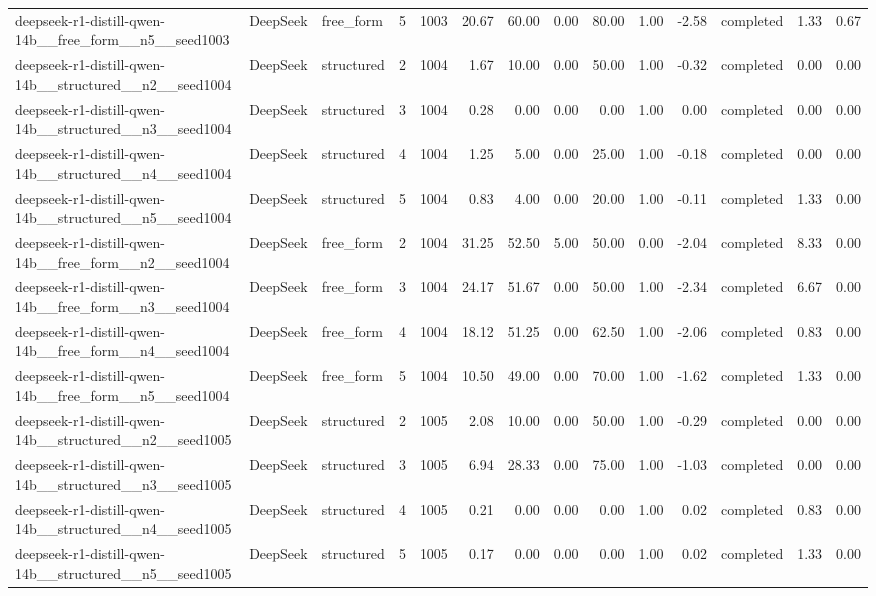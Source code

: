 \begin{longtable}{lllrrrrrrrrlrr}
deepseek-r1-distill-qwen-14b\_\_free\_form\_\_n5\_\_seed1003 & DeepSeek & free\_form & 5 & 1003 & 20.67 & 60.00 & 0.00 & 80.00 & 1.00 & -2.58 & completed & 1.33 & 0.67 \\
deepseek-r1-distill-qwen-14b\_\_structured\_\_n2\_\_seed1004 & DeepSeek & structured & 2 & 1004 & 1.67 & 10.00 & 0.00 & 50.00 & 1.00 & -0.32 & completed & 0.00 & 0.00 \\
deepseek-r1-distill-qwen-14b\_\_structured\_\_n3\_\_seed1004 & DeepSeek & structured & 3 & 1004 & 0.28 & 0.00 & 0.00 & 0.00 & 1.00 & 0.00 & completed & 0.00 & 0.00 \\
deepseek-r1-distill-qwen-14b\_\_structured\_\_n4\_\_seed1004 & DeepSeek & structured & 4 & 1004 & 1.25 & 5.00 & 0.00 & 25.00 & 1.00 & -0.18 & completed & 0.00 & 0.00 \\
deepseek-r1-distill-qwen-14b\_\_structured\_\_n5\_\_seed1004 & DeepSeek & structured & 5 & 1004 & 0.83 & 4.00 & 0.00 & 20.00 & 1.00 & -0.11 & completed & 1.33 & 0.00 \\
deepseek-r1-distill-qwen-14b\_\_free\_form\_\_n2\_\_seed1004 & DeepSeek & free\_form & 2 & 1004 & 31.25 & 52.50 & 5.00 & 50.00 & 0.00 & -2.04 & completed & 8.33 & 0.00 \\
deepseek-r1-distill-qwen-14b\_\_free\_form\_\_n3\_\_seed1004 & DeepSeek & free\_form & 3 & 1004 & 24.17 & 51.67 & 0.00 & 50.00 & 1.00 & -2.34 & completed & 6.67 & 0.00 \\
deepseek-r1-distill-qwen-14b\_\_free\_form\_\_n4\_\_seed1004 & DeepSeek & free\_form & 4 & 1004 & 18.12 & 51.25 & 0.00 & 62.50 & 1.00 & -2.06 & completed & 0.83 & 0.00 \\
deepseek-r1-distill-qwen-14b\_\_free\_form\_\_n5\_\_seed1004 & DeepSeek & free\_form & 5 & 1004 & 10.50 & 49.00 & 0.00 & 70.00 & 1.00 & -1.62 & completed & 1.33 & 0.00 \\
deepseek-r1-distill-qwen-14b\_\_structured\_\_n2\_\_seed1005 & DeepSeek & structured & 2 & 1005 & 2.08 & 10.00 & 0.00 & 50.00 & 1.00 & -0.29 & completed & 0.00 & 0.00 \\
deepseek-r1-distill-qwen-14b\_\_structured\_\_n3\_\_seed1005 & DeepSeek & structured & 3 & 1005 & 6.94 & 28.33 & 0.00 & 75.00 & 1.00 & -1.03 & completed & 0.00 & 0.00 \\
deepseek-r1-distill-qwen-14b\_\_structured\_\_n4\_\_seed1005 & DeepSeek & structured & 4 & 1005 & 0.21 & 0.00 & 0.00 & 0.00 & 1.00 & 0.02 & completed & 0.83 & 0.00 \\
deepseek-r1-distill-qwen-14b\_\_structured\_\_n5\_\_seed1005 & DeepSeek & structured & 5 & 1005 & 0.17 & 0.00 & 0.00 & 0.00 & 1.00 & 0.02 & completed & 1.33 & 0.00 \\

\end{longtable}
